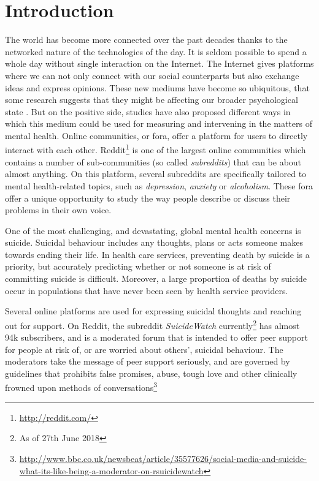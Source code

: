 \section{Introduction}

The world has become more connected over the past decades thanks to the networked nature of the technologies of the day. It is seldom possible to spend a whole day without single interaction on the Internet. The Internet gives platforms where we can not only connect with our social counterparts but also exchange ideas and express opinions. These new mediums have become so ubiquitous, that some research suggests that they might be affecting our broader psychological state \cite{d20122}. But on the positive side, studies have also proposed different ways in which this medium could be used for measuring and intervening in the matters of mental health\cite{DeChoudhury2016,DeChoudhury2014}.
Online communities, or fora, offer a platform for users to directly interact with each other. Reddit\footnote{\url{http://reddit.com/}} is one of the largest online communities which contains a number of sub-communities (so called \emph{subreddits}) that can be about almost anything. On this platform, several subreddits are specifically tailored to mental health-related topics, such as \emph{depression}, \emph{anxiety} or \emph{alcoholism}. These fora offer a unique opportunity to study the way people describe or discuss their problems in their own voice.

One of the most challenging, and devastating, global mental health concerns is suicide. Suicidal behaviour includes any thoughts, plans or acts someone makes towards ending their life. In health care services, preventing death by suicide is a priority, but accurately predicting whether or not someone is at risk of committing suicide is difficult. Moreover, a large proportion of deaths by suicide occur in populations that have never been seen by health service providers.

Several online platforms are used for expressing suicidal thoughts and reaching out for support. On Reddit, the subreddit \emph{SuicideWatch} currently\footnote{As of 27th June 2018} has almost 94k subscribers, and is a moderated forum that is intended to offer peer support for people at risk of, or are worried about others', suicidal behaviour. The moderators take the message of peer support seriously, and are governed by guidelines that prohibits false promises, abuse, tough love and other clinically frowned upon methods of conversations\footnote{\url{http://www.bbc.co.uk/newsbeat/article/35577626/social-media-and-suicide-what-its-like-being-a-moderator-on-rsuicidewatch} }


